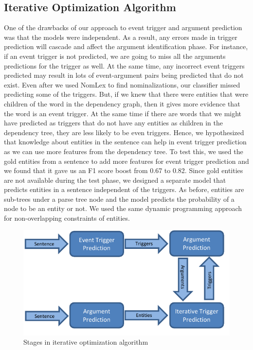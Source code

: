\subsection{Iterative Optimization Algorithm}
One of the drawbacks of our approach to event trigger and argument prediction was that the models were independent. As a result, any errors made in trigger prediction will cascade and affect the argument identification phase. For instance, if an event trigger is not predicted, we are going to miss all the arguments predictions for the trigger as well. At the same time, any incorrect event triggers predicted may result in lots of event-argument pairs being predicted that do not exist. Even after we used NomLex to find nominalizations, our classifier missed predicting some of the triggers. But, if we knew that there were entities that were children of the word in the dependency graph, then it gives more evidence that the word is an event trigger. At the same time if there are words that we might have predicted as triggers that do not have any entities as children in the dependency tree, they are less likely to be even triggers. Hence, we hypothesized that knowledge about entities in the sentence can help in event trigger prediction as we can use more features from the dependency tree. To test this, we used the gold entities from a sentence to add more features for event trigger prediction and we found that it gave us an F1 score boost from 0.67 to 0.82. Since gold entities are not available during the test phase, we designed a separate model that predicts entities in a sentence independent of the triggers. As before, entities are sub-trees under a parse tree node and the model predicts the probability of a node to be an entity or not. We used the same dynamic programming approach for non-overlapping constraints of entities.

\begin{figure}[t]
	\includegraphics[width=1\columnwidth]{Images/IO}
	\caption{Stages in iterative optimization algorithm}
	\label{fig:iosteps}
\end{figure}

